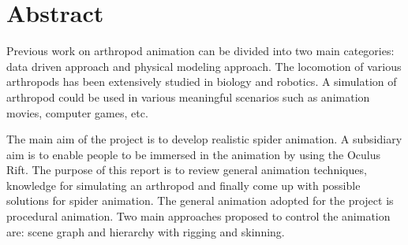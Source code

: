 \chapter*{\Large \center Abstract}
Previous work on arthropod animation can be divided into two main categories: data driven approach and physical modeling approach. The locomotion of various arthropods has been extensively studied in biology and robotics. A simulation of arthropod could be used in various meaningful scenarios such as animation movies, computer games, etc.



The main aim of the project is to develop realistic spider animation. A subsidiary aim is to enable people to be immersed in the animation by using the Oculus Rift. The purpose of this report is to review general animation techniques, knowledge for simulating an arthropod and finally come up with possible solutions for spider animation. The general animation adopted for the project is procedural animation. Two main approaches proposed to control the animation are: scene graph and hierarchy with rigging and skinning.


